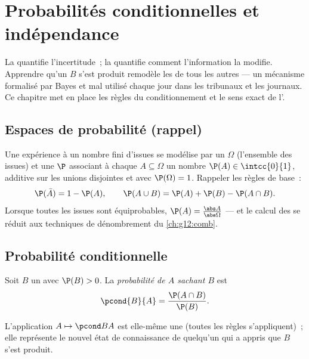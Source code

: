 \chapter{Probabilités conditionnelles et indépendance}\label{ch:g12:condprob}

La  quantifie l'incertitude~; la 
quantifie comment l'information la modifie. Apprendre qu'un  $B$
s'est produit remodèle les  de tous les autres  ---
un mécanisme formalisé par Bayes et mal utilisé chaque jour dans les
tribunaux et les journaux. Ce chapitre met en place les règles du
conditionnement et le sens exact de l'.

\section{Espaces de probabilité (rappel)}

Une expérience à un nombre fini d'issues se modélise par un \emph{}
$\Omega$ (l'ensemble des issues) et une  $\P$ associant à chaque
 $A \subseteq \Omega$ un nombre $\P(A) \in \intcc{0}{1}$, additive
sur les unions disjointes et avec $\P(\Omega) = 1$. Rappeler les règles de
base~:
\[
\P(\bar A) = 1 - \P(A),
\qquad
\P(A \cup B) = \P(A) + \P(B) - \P(A \cap B).
\]
Lorsque toutes les issues sont équiprobables,
$\P(A) = \frac{\abs A}{\abs\Omega}$ --- et le calcul des  se
réduit aux techniques de dénombrement du \cref{ch:g12:comb}.

\section{Probabilité conditionnelle}

\begin{definition}\label{def:g12:condprob:cond}
Soit $B$ un  avec $\P(B) > 0$. La \emph{probabilité de $A$ sachant
$B$} est
\[
\pcond{B}{A} = \frac{\P(A \cap B)}{\P(B)} .
\]
\end{definition}

L'application $A \mapsto \pcond BA$ est elle-même une  (toutes
les règles s'appliquent)~; elle représente le nouvel état de connaissance de
quelqu'un qui a appris que $B$ s'est produit.

